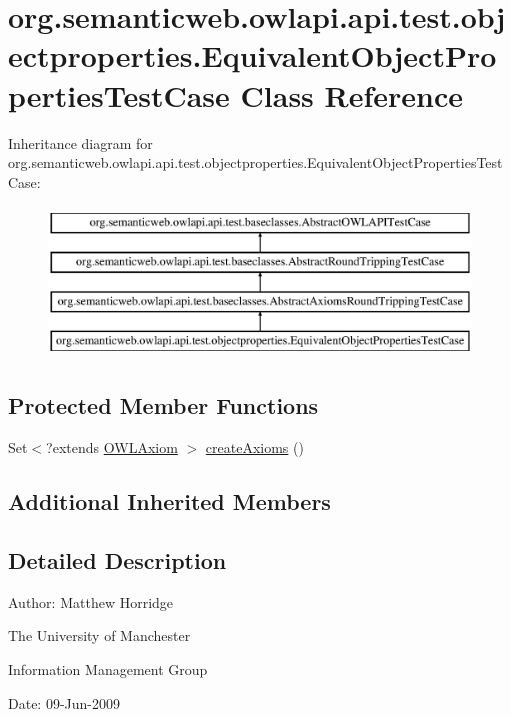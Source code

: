 \hypertarget{classorg_1_1semanticweb_1_1owlapi_1_1api_1_1test_1_1objectproperties_1_1_equivalent_object_properties_test_case}{\section{org.\-semanticweb.\-owlapi.\-api.\-test.\-objectproperties.\-Equivalent\-Object\-Properties\-Test\-Case Class Reference}
\label{classorg_1_1semanticweb_1_1owlapi_1_1api_1_1test_1_1objectproperties_1_1_equivalent_object_properties_test_case}
}
Inheritance diagram for org.\-semanticweb.\-owlapi.\-api.\-test.\-objectproperties.\-Equivalent\-Object\-Properties\-Test\-Case\-:\begin{figure}[H]
\begin{center}
\leavevmode
\includegraphics[height=4.000000cm]{classorg_1_1semanticweb_1_1owlapi_1_1api_1_1test_1_1objectproperties_1_1_equivalent_object_properties_test_case}
\end{center}
\end{figure}
\subsection*{Protected Member Functions}
\begin{DoxyCompactItemize}
\item 
Set$<$?extends \hyperlink{interfaceorg_1_1semanticweb_1_1owlapi_1_1model_1_1_o_w_l_axiom}{O\-W\-L\-Axiom} $>$ \hyperlink{classorg_1_1semanticweb_1_1owlapi_1_1api_1_1test_1_1objectproperties_1_1_equivalent_object_properties_test_case_a385a1b8e553350043f0bf74769ac7ea7}{create\-Axioms} ()
\end{DoxyCompactItemize}
\subsection*{Additional Inherited Members}


\subsection{Detailed Description}
Author\-: Matthew Horridge\par
 The University of Manchester\par
 Information Management Group\par
 Date\-: 09-\/\-Jun-\/2009 

